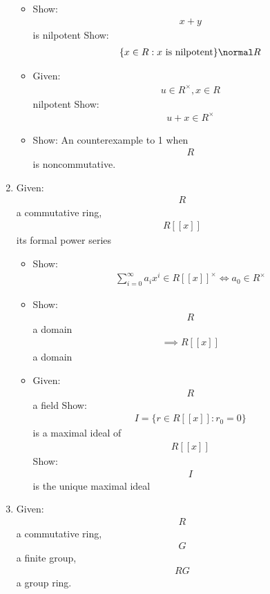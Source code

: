 \begin{enumerate}
  \begin{itemize}
  \tightlist
  \item
    Show: \begin{align*}
    x+y\end{align*}
     is nilpotent Show: \begin{align*}
    \{x\in R : x \text{ is nilpotent}\} \normal R\end{align*}
  \item
    Given: \begin{align*}
    u\in R^\times, x\in R\end{align*}
     nilpotent Show: \begin{align*}
    u+x\in R^\times\end{align*}
  \item
    Show: An counterexample to 1 when \begin{align*}
    R\end{align*}
     is noncommutative.
  \end{itemize}
\item
  Given: \begin{align*}
  R\end{align*}
   a commutative ring, \begin{align*}
  R[[x]]\end{align*}
   its formal power series

  \begin{itemize}
  \tightlist
  \item
    Show: \begin{align*}
    \sum_{i=0}^\infty a_i x^i \in R[[x]]^\times \iff a_0 \in R^\times\end{align*}
  \item
    Show: \begin{align*}
    R\end{align*}
     a domain \begin{align*}
    \implies R[[x]]\end{align*}
     a domain
  \item
    Given: \begin{align*}
    R\end{align*}
     a field Show: \begin{align*}
    I = \{ r \in R[[x]] : r_0 = 0\}\end{align*}
     is a maximal ideal of \begin{align*}
    R[[x]]\end{align*}
     Show: \begin{align*}
    I\end{align*}
     is the unique maximal ideal
  \end{itemize}
\item
  Given: \begin{align*}
  R\end{align*}
   a commutative ring, \begin{align*}
  G\end{align*}
   a finite group, \begin{align*}
  RG\end{align*}
   a group ring.


\end{enumerate}
